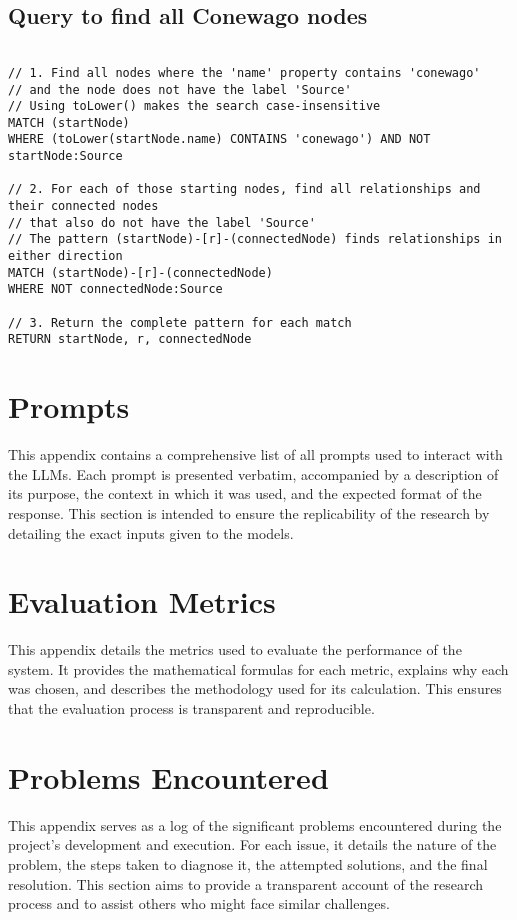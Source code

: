 \section{Query to find all Conewago nodes}
\begin{verbatim}

// 1. Find all nodes where the 'name' property contains 'conewago'
// and the node does not have the label 'Source'
// Using toLower() makes the search case-insensitive
MATCH (startNode)
WHERE (toLower(startNode.name) CONTAINS 'conewago') AND NOT startNode:Source

// 2. For each of those starting nodes, find all relationships and their connected nodes
// that also do not have the label 'Source'
// The pattern (startNode)-[r]-(connectedNode) finds relationships in either direction
MATCH (startNode)-[r]-(connectedNode)
WHERE NOT connectedNode:Source

// 3. Return the complete pattern for each match
RETURN startNode, r, connectedNode
\end{verbatim}

\chapter{Prompts}
This appendix contains a comprehensive list of all prompts used to interact with the LLMs. Each prompt is presented verbatim, accompanied by a description of its purpose, the context in which it was used, and the expected format of the response. This section is intended to ensure the replicability of the research by detailing the exact inputs given to the models.

\chapter{Evaluation Metrics}
This appendix details the metrics used to evaluate the performance of the system. It provides the mathematical formulas for each metric, explains why each was chosen, and describes the methodology used for its calculation. This ensures that the evaluation process is transparent and reproducible.

\chapter{Problems Encountered}
This appendix serves as a log of the significant problems encountered during the project's development and execution. For each issue, it details the nature of the problem, the steps taken to diagnose it, the attempted solutions, and the final resolution. This section aims to provide a transparent account of the research process and to assist others who might face similar challenges.

